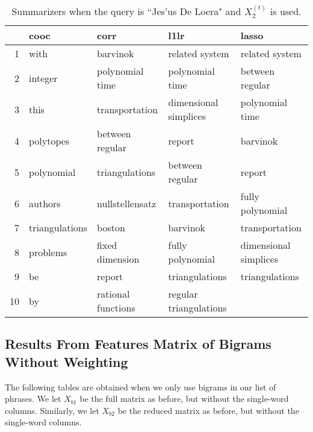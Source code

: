 \documentclass{article}
\begin{document}
\begin{table}[H]
\begin{center}
\begin{tabular}{|r|llll|}
\hline
& cooc & corr & l1lr & lasso \\
\hline
1 & with & barvinok & related system & related system \\
2 & integer & polynomial time & polynomial time & between regular \\
3 & this & transportation & dimensional simplices & polynomial time \\
4 & polytopes & between regular & report & barvinok \\
5 & polynomial & triangulations & between regular & report \\
6 & authors & nullstellensatz & transportation & fully polynomial \\
7 & triangulations & boston & barvinok & transportation \\
8 & problems & fixed dimension & fully polynomial & dimensional simplices \\
9 & be & report & triangulations & triangulations \\
10 & by & rational functions & regular triangulations & \\
\hline
\end{tabular}
\end{center}
\caption{Summarizers when the query is ``Jes\a'us De Loera" and $X_2^{(t)}$ is used.}
\end{table}

\subsection{Results From Features Matrix of Bigrams Without Weighting}
The following tables are obtained when we only use bigrams in our list of phrases. We let $X_{b1}$ be the full matrix as before, but without the single-word columns. Similarly, we let $X_{b2}$ be the reduced matrix as before, but without the single-word columns.
\end{document}
